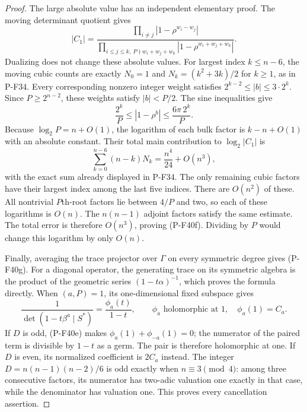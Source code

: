 \begin{proof}
The large absolute value has an independent elementary
proof. The moving determinant quotient gives
\[
 |C_1|=
 \frac{\prod_{i\ne j}|1-\rho^{w_i-w_j}|}
 {\prod_{i\le j\le k,\ P\nmid w_i+w_j+w_k}
                    |1-\rho^{w_i+w_j+w_k}|}.
 \tag{P-F40j}
\]
Dualizing does not change these absolute values.
For largest index $k\le n-6$, the moving cubic counts
are exactly $N_0=1$ and $N_k=(k^2+3k)/2$ for $k\ge1$,
as in P-F34. Every corresponding nonzero integer weight
satisfies $2^{k-2}\le|b|\le3\cdot2^k$.
Since $P\ge2^{n-2}$, these weights satisfy $|b|<P/2$.
The sine inequalities give
\[
       \frac{2^k}{P}\le|1-\rho^b|
                   \le\frac{6\pi\,2^k}{P}.
\]
Because $\log_2P=n+O(1)$, the logarithm of each bulk
factor is $k-n+O(1)$ with an absolute constant.
Their total main contribution to $\log_2|C_1|$ is
\[
 \sum_{k=0}^{n-6}(n-k)N_k=\frac{n^4}{24}+O(n^3),
\]
with the exact sum already displayed in P-F34.
The only remaining cubic factors have their largest
index among the last five indices. There are $O(n^2)$
of these. All nontrivial $P$th-root factors lie between
$4/P$ and two, so each of these logarithms is $O(n)$.
The $n(n-1)$ adjoint factors satisfy the same estimate.
The total error is therefore $O(n^3)$, proving (P-F40f).
Dividing by $P$ would change this logarithm by only $O(n)$.

Finally, averaging the trace projector over $\Gamma$ on
every symmetric degree gives (P-F40g). For a diagonal
operator, the generating trace on its symmetric algebra
is the product of the geometric series
$(1-t\alpha)^{-1}$, which proves the formula directly.
When $(a,P)=1$, its one-dimensional fixed subspace gives
\[
 \frac1{\det(1-t\beta^a\mid S^*)}
       =\frac{\phi_a(t)}{1-t},\qquad
 \phi_a\text{ holomorphic at }1,\quad\phi_a(1)=C_a.
\]
If $D$ is odd, (P-F40e) makes
$\phi_a(1)+\phi_{-a}(1)=0$; the numerator of the paired
term is divisible by $1-t$ as a germ. The pair is
therefore holomorphic at one. If $D$ is even, its
normalized coefficient is $2C_a$ instead.
The integer $D=n(n-1)(n-2)/6$ is odd exactly when
$n\equiv3\pmod4$: among three consecutive factors,
its numerator has two-adic valuation one exactly
in that case, while the denominator has valuation one.
This proves every cancellation assertion.


\end{proof}
